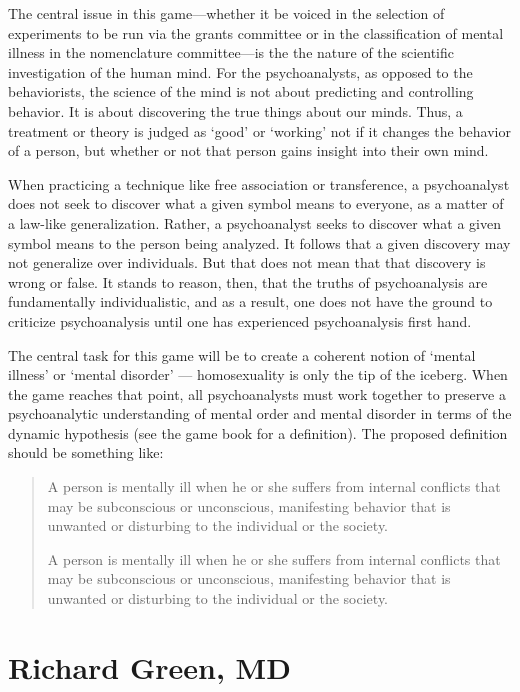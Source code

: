 \begin{refsection}
The central issue in this game—whether it be voiced in the selection of experiments to be run via the grants committee or in the classification of mental illness in the nomenclature committee—is the the nature of the scientific investigation of the human mind. For the psychoanalysts, as opposed to the behaviorists, the science of the mind is not about predicting and controlling behavior. It is about discovering the true things about our minds. Thus, a treatment or theory is judged as `good' or `working' not if it changes the behavior of a person, but whether or not that person gains insight into their own mind.

When practicing a technique like free association or transference, a psychoanalyst does not seek to discover what a given symbol means to everyone, as a matter of a law-like generalization. Rather, a psychoanalyst seeks to discover what a given symbol means to the person being analyzed. It follows that a given discovery may not generalize over individuals. But that does not mean that that discovery is wrong or false. It stands to reason, then, that the truths of psychoanalysis are fundamentally individualistic, and as a result, one does not have the ground to criticize psychoanalysis until one has experienced psychoanalysis first hand.

The central task for this game will be to create a coherent notion of ‘mental illness’ or ‘mental disorder’ — homosexuality is only the tip of the iceberg. When the game reaches that point, all psychoanalysts must work together to preserve a psychoanalytic understanding of mental order and mental disorder in terms of the dynamic hypothesis (see the game book for a definition). The proposed definition should be something like:

\begin{quote}

A person is mentally ill when he or she suffers from internal conflicts that may be subconscious or unconscious, manifesting behavior that is unwanted or disturbing to the individual or the society.\begin{proposal}[Psychoanalysts]\label{proposal:psychoanalysts}A person is mentally ill when he or she suffers from internal conflicts that may be subconscious or unconscious, manifesting behavior that is unwanted or disturbing to the individual or the society.\end{proposal}
\end{quote}

\chapter{Richard Green, MD}
\label{richardgreenmd}


\end{refsection}
